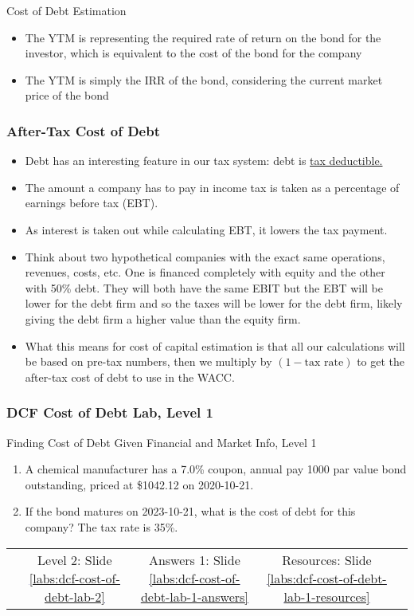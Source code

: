 \documentclass[handout, 11pt]{beamer}
\begin{document}
\begin{section}[Debt]{Cost of Debt Estimation}
\begin{frame}
\begin{itemize}
\vfill
\item The YTM is representing the required rate of return on the bond for the investor, which is equivalent to the cost of the bond for the company
\vfill
\item The YTM is simply the IRR of the bond, considering the current market price of the bond
\end{itemize}
\end{frame}
\begin{frame}
\frametitle{After-Tax Cost of Debt}
\begin{itemize}
\small
\vfill
\item Debt has an interesting feature in our tax system: debt is
\underline{tax deductible.}
\vfill
\item The amount a company has to pay in income tax is taken as a percentage of earnings before tax (EBT).
\vfill
\item As interest is taken out while calculating EBT, it lowers the tax payment.
\vfill
\item Think about two hypothetical companies with the exact same operations, revenues, costs, etc. One is financed completely with equity and the other with 50\% debt. They will both have the same EBIT but the EBT will be lower for the debt firm and so the taxes will be lower for the debt firm, likely giving the debt firm a higher value than the equity firm.
\vfill
\item What this means for cost of capital estimation is that all our calculations will be based on pre-tax numbers, then we multiply by $(1 - \text{tax rate})$ to get the after-tax cost of debt to use in the WACC.
\end{itemize}
\end{frame}
\begin{frame}
\frametitle{DCF Cost of Debt Lab, Level 1}
{
\begin{block}{Finding Cost of Debt Given Financial and Market Info, Level 1}
\begin{enumerate}
\item A chemical manufacturer has a 7.0\% coupon, annual pay 1000 par value bond outstanding, priced at \$1042.12 on 2020-10-21.
\item If the bond matures on 2023-10-21, what is the cost of debt for this company? The tax rate is 35\%.
\end{enumerate}
\vfill
\begin{tabular*}{\textwidth}{@{\extracolsep{\fill}}ccccc}
\toprule
\hfill & Level 2: Slide \textcolor{blue}{\underline{\ref{labs:dcf-cost-of-debt-lab-2}}} & Answers 1: Slide \textcolor{blue}{\underline{\ref{labs:dcf-cost-of-debt-lab-1-answers}}} & Resources: Slide \textcolor{blue}{\underline{\ref{labs:dcf-cost-of-debt-lab-1-resources}}} & \hfill\\


\end{tabular*}
\end{block}}
\end{frame}
\end{section}
\end{document}
